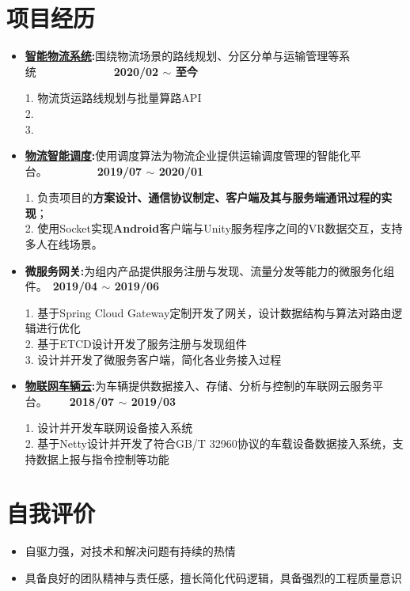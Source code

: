 \documentclass[letterpaper, UTF8, 11pt]{article}
\begin{document}
	\section*{\textbf{项目经历}}\vspace{-0.12in}
	\begin{itemize}	
		\item \textbf{\href{https://lbsyun.baidu.com/solutions/logisticsmap}{智能物流系统}:}{围绕物流场景的路线规划、分区分单与运输管理等系统}~~~~~~~~~~~~~~\textbf{2020/02 $\sim$ 至今}
		
		1. 物流货运路线规划与批量算路API\\
		2. \\
		3. 
		
		\vspace{0.03in}

		\item \textbf{\href{https://lbsyun.baidu.com/solutions/scheduling}{物流智能调度}:}{使用调度算法为物流企业提供运输调度管理的智能化平台。}~~~~~~~~~\textbf{2019/07 $\sim$ 2020/01}
		
		1. 负责项目的\textbf{方案设计、通信协议制定、客户端及其与服务端通讯过程的实现}；\\
		2. 使用Socket实现\textbf{Android}客户端与Unity服务程序之间的VR数据交互，支持多人在线场景。
		
		\vspace{0.03in}

		\item \textbf{微服务网关:}{为组内产品提供服务注册与发现、流量分发等能力的微服务化组件。}~\textbf{2019/04 $\sim$ 2019/06}
		
		1. 基于Spring Cloud Gateway定制开发了网关，设计数据结构与算法对路由逻辑进行优化\\
		2. 基于ETCD设计开发了服务注册与发现组件\\
		3. 设计并开发了微服务客户端，简化各业务接入过程
		
		\vspace{0.03in}
		
		\item \textbf{\href{https://cloud.baidu.com/product/dugo.html}{物联网车辆云}:}{为车辆提供数据接入、存储、分析与控制的车联网云服务平台。}~~~~\textbf{2018/07 $\sim$ 2019/03}
		
		1. 设计并开发车联网设备接入系统\\
		2. 基于Netty设计并开发了符合GB/T 32960协议的车载设备数据接入系统，支持数据上报与指令控制等功能
		
		\vspace{0.03in}
		
	\end{itemize}
	\vspace{-0.32in}
	
	\section*{\textbf{自我评价}}\vspace{-0.12in}
	\begin{itemize}	
		\item 自驱力强，对技术和解决问题有持续的热情
		\item 具备良好的团队精神与责任感，擅长简化代码逻辑，具备强烈的工程质量意识
	\end{itemize}
	\vspace{-0.32in}
\end{document}
